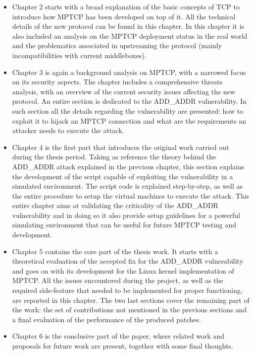 \begin{itemize}
  \item Chapter 2 starts with a broad explanation of the basic concepts of TCP to introduce how MPTCP has been developed on top of it. All the technical details of the new protocol can be found in this chapter. In this chapter it is also included an analysis on the MPTCP deployment status in the real world and the problematics associated in upstreaming the protocol (mainly incompatibilities with current middleboxes).
  
  \item Chapter 3 is again a background analysis on MPTCP, with a narrowed focus on its security aspects. The chapter includes a comprehensive threats analysis, with an overview of the current security issues affecting the new protocol. An entire section is dedicated to the ADD\_ADDR vulnerability. In such section all the details regarding the vulnerability are presented: how to exploit it to hijack an MPTCP connection and what are the requirements  an attacker needs to execute the attack.
  
  \item Chapter 4 is the first part that introduces the original work carried out during the thesis period. Taking as reference the theory behind the ADD\_ADDR attack explained in the previous chapter, this section explains the development of the script capable of exploiting the vulnerability in a simulated environment. The script code is explained step-by-step, as well as the entire procedure to setup the virtual machines to execute the attack. This entire chapter aims at validating the criticality of the ADD\_ADDR vulnerability and in doing so it also provide setup guidelines for a powerful simulating environment that can be useful for future MPTCP testing and development.
  
  \item Chapter 5 contains the core part of the thesis work. It starts with a theoretical evaluation of the accepted fix for the ADD\_ADDR vulnerability and goes on with its development for the Linux kernel implementation of MPTCP. All the issues encountered during the project, as well as the required side-feature that needed to be implemented for proper functioning, are reported in this chapter. The two last sections cover the remaining part of the work: the set of contributions not mentioned in the previous sections and a final evaluation of the performance of the produced patches.
  
  \item Chapter 6 is the conclusive part of the paper, where related work and proposals for future work are present, together with some final thoughts.
\end{itemize}